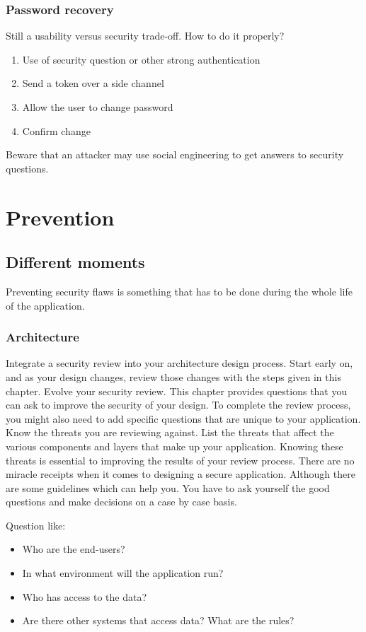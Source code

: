 \subsubsection*{Password recovery}
Still a usability versus security trade-off.
How to do it properly?
\begin{enumerate}
\item Use of security question or other strong authentication
\item Send a token over a side channel
\item Allow the user to change password
\item Confirm change
\end{enumerate}
Beware that an attacker may use social engineering to get answers to security
questions.

\section{Prevention}

\subsection{Different moments}
Preventing security flaws is something that has to be done during the
whole life of the application.

\subsubsection{Architecture}
Integrate a security review into your architecture design process. Start
early on, and as your design changes, review those changes with the
steps given in this chapter.
Evolve your security review. This chapter provides questions that you
can ask to improve the security of your design. To complete the review
process, you might also need to add specific questions that are unique
to your application.
Know the threats you are reviewing against. List the threats that affect the
various components and layers that make up your application.
Knowing these threats is essential to improving the results of your review process.
There are no miracle receipts when it comes to designing a secure
application. Although there are some guidelines which can help you. You
have to ask yourself the good questions and make decisions on a case by
case basis.

Question like:
\begin{itemize}
\item Who are the end-users?
\item In what environment will the application run?
\item Who has access to the data?
\item Are there other systems that access data? What are the rules?
\end{itemize}

